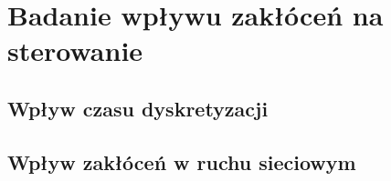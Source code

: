 \section{Badanie wpływu zakłóceń na sterowanie}
\label{sec:zaklocenia}


\subsection{Wpływ czasu dyskretyzacji}
\label{sub:zaklocenia-dyskretyzacja}


\subsection{Wpływ zakłóceń w ruchu sieciowym}
\label{sub:zaklocenia-siec}
